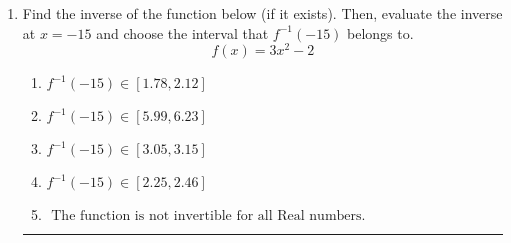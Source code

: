 \documentclass[14pt]{extbook}
\newcommand{\litem}[1]{\item#1\hspace*{-1cm}\rule{\textwidth}{0.4pt}}
\begin{document}
\begin{enumerate}
{\begin{enumerate}[label=\Alph*.]
\end{enumerate} }
\litem{
Find the inverse of the function below (if it exists). Then, evaluate the inverse at $x = -15$ and choose the interval that $f^{-1}(-15)$ belongs to.\[ f(x) = 3 x^2 - 2 \]\begin{enumerate}[label=\Alph*.]
\item \( f^{-1}(-15) \in [1.78, 2.12] \)
\item \( f^{-1}(-15) \in [5.99, 6.23] \)
\item \( f^{-1}(-15) \in [3.05, 3.15] \)
\item \( f^{-1}(-15) \in [2.25, 2.46] \)
\item \( \text{ The function is not invertible for all Real numbers. } \)

\end{enumerate} }
\end{enumerate}
\end{document}

